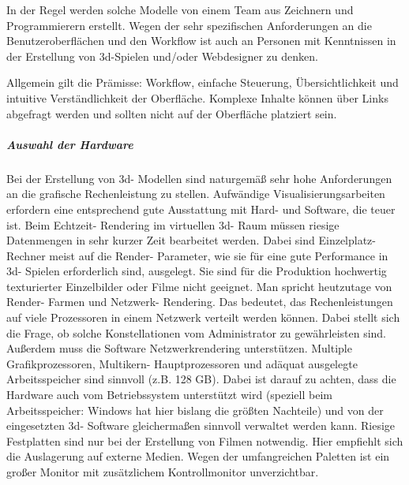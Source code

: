 In der Regel werden solche Modelle von einem Team aus Zeichnern und Programmierern erstellt. Wegen der sehr spezifischen Anforderungen an die Benutzeroberflächen und den Workflow ist auch an Personen mit Kenntnissen in der Erstellung von 3d-Spielen und/oder Webdesigner zu denken. 

Allgemein gilt die Prämisse: Workflow, einfache Steuerung, Übersichtlichkeit und intuitive Verständlichkeit der Oberfläche. Komplexe Inhalte können über Links abgefragt werden und sollten nicht auf der Oberfläche platziert sein.

\subparagraph{Auswahl der Hardware} Bei der Erstellung von 3d- Modellen sind naturgemäß sehr hohe Anforderungen an die grafische Rechenleistung zu stellen. Aufwändige Visualisierungsarbeiten erfordern eine entsprechend gute Ausstattung mit Hard- und Software, die teuer ist. Beim Echtzeit- Rendering im virtuellen 3d- Raum müssen riesige Datenmengen in sehr kurzer Zeit bearbeitet werden. Dabei sind Einzelplatz- Rechner meist auf die Render- Parameter, wie sie für eine gute Performance in 3d- Spielen erforderlich sind, ausgelegt. Sie sind für die Produktion hochwertig texturierter Einzelbilder oder Filme nicht geeignet. Man spricht heutzutage von Render- Farmen und Netzwerk- Rendering. Das bedeutet, das Rechenleistungen auf viele Prozessoren in einem Netzwerk verteilt werden können. Dabei stellt sich die Frage, ob solche Konstellationen vom Administrator zu gewährleisten sind. Außerdem muss die Software Netzwerkrendering unterstützen. Multiple Grafikprozessoren, Multikern- Hauptprozessoren und adäquat ausgelegte Arbeitsspeicher sind sinnvoll (z.B. 128 GB). Dabei ist darauf zu achten, dass die Hardware auch vom Betriebssystem unterstützt wird (speziell beim Arbeitsspeicher: Windows hat hier bislang die größten Nachteile) und von der eingesetzten 3d- Software gleichermaßen sinnvoll verwaltet werden kann. Riesige Festplatten sind nur bei der Erstellung von Filmen notwendig. Hier empfiehlt sich die Auslagerung auf externe Medien. Wegen der umfangreichen Paletten ist ein großer Monitor mit zusätzlichem Kontrollmonitor unverzichtbar. 


